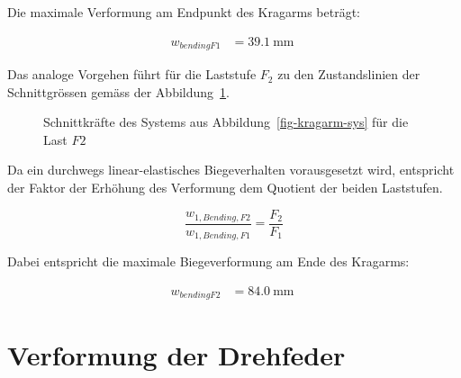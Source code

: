\documentclass[
  10pt,
  letterpaper,
]{scrreprt}
\begin{document}
Die maximale Verformung am Endpunkt des Kragarms beträgt:

$$
\begin{aligned}
w_{bendingF1} &= 39.1\ \mathrm{mm} \;
\end{aligned}
$$

Das analoge Vorgehen führt für die Laststufe \(F_2\) zu den
Zustandslinien der Schnittgrössen gemäss der
Abbildung~\ref{fig-skkragarmreal_high}.

\begin{figure}[H]


\caption{\label{fig-skkragarmreal_high}Schnittkräfte des Systems aus
Abbildung~\ref{fig-kragarm-sys} für die Last \(F2\)}

\end{figure}%

Da ein durchwegs linear-elastisches Biegeverhalten vorausgesetzt wird,
entspricht der Faktor der Erhöhung des Verformung dem Quotient der
beiden Laststufen.

\[
\frac{w_{1,Bending,F2}}{w_{1,Bending,F1}} = \frac{F_2}{F_1}
\]

Dabei entspricht die maximale Biegeverformung am Ende des Kragarms:

$$
\begin{aligned}
w_{bendingF2} &= 84.0\ \mathrm{mm} \;
\end{aligned}
$$

\section{Verformung der Drehfeder}\label{verformung-der-drehfeder}
\end{document}
